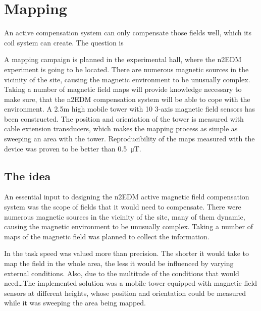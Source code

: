 \chapter{Mapping}
An active compensation system can only compensate those fields well, which its coil system can create. The question is


A mapping campaign is planned in the experimental hall, where the n2EDM experiment is going to be located. There are numerous magnetic sources in the vicinity of the site, causing the magnetic environment to be unusually complex. Taking a number of magnetic field maps will provide knowledge necessary to make sure, that the n2EDM compensation system will be able to cope with the environment. A 2.5m high mobile tower with 10 3-axis magnetic field sensors has been constructed. The position and orientation of the tower is measured with cable extension transducers, which makes the mapping process as simple as sweeping an area with the tower. Reproducibility of the maps measured with the device was proven to be better than \SI{0.5}{\micro\tesla}.




\section{The idea}
An essential input to designing the n2EDM active magnetic field compensation system was the scope of fields that it would need to compensate. There were numerous magnetic sources in the vicinity of the  site, many of them dynamic, causing the magnetic environment to be unusually complex. Taking a number of maps of the magnetic field was planned to collect the information.

In the task speed was valued more than precision. The shorter it would take to map the field in the whole area, the less it would be influenced by varying external conditions. Also, due to the multitude of the conditions that would need\ldots The implemented solution was a mobile tower equipped with magnetic field sensors at different heights, whose position and orientation could be measured while it was sweeping the area being mapped.

